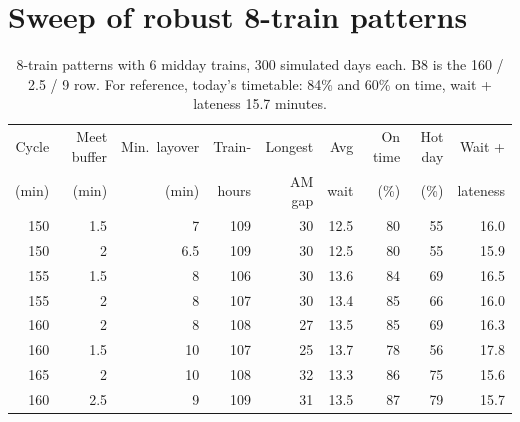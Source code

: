 \documentclass[11pt]{article}
\begin{document}
\section{Sweep of robust 8-train patterns}\label{app:sweep}
\begin{table}[ht]\centering\small
\begin{tabular}{@{}rrrrrrrrr@{}}
\toprule
Cycle & Meet buffer & Min.\ layover & Train- & Longest & Avg & On time & Hot day & Wait + \\
(min) & (min) & (min) & hours & AM gap & wait & (\%) & (\%) & lateness \\
\midrule
150 & 1.5 & 7 & 109 & 30 & 12.5 & 80 & 55 & 16.0 \\
150 & 2 & 6.5 & 109 & 30 & 12.5 & 80 & 55 & 15.9 \\
155 & 1.5 & 8 & 106 & 30 & 13.6 & 84 & 69 & 16.5 \\
155 & 2 & 8 & 107 & 30 & 13.4 & 85 & 66 & 16.0 \\
160 & 2 & 8 & 108 & 27 & 13.5 & 85 & 69 & 16.3 \\
160 & 1.5 & 10 & 107 & 25 & 13.7 & 78 & 56 & 17.8 \\
165 & 2 & 10 & 108 & 32 & 13.3 & 86 & 75 & 15.6 \\
160 & 2.5 & 9 & 109 & 31 & 13.5 & 87 & 79 & 15.7 \\
\bottomrule
\end{tabular}
\caption{8-train patterns with 6 midday trains, 300 simulated days each. B8 is the 160 / 2.5 / 9 row. For reference, today's timetable: 84\% and 60\% on time, wait + lateness 15.7 minutes.}\label{tab:sweep}
\end{table}
\end{document}
